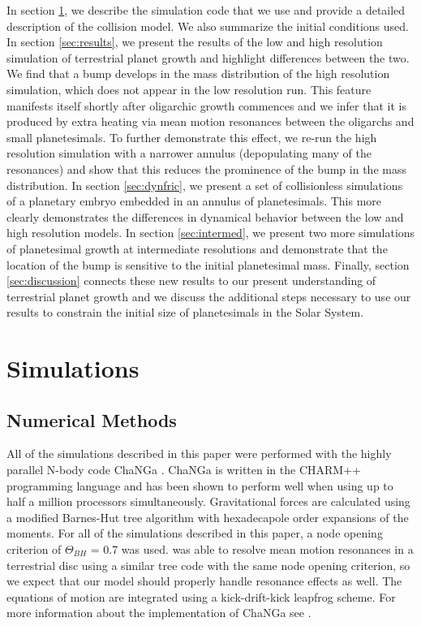 In section \ref{sec:sim}, we describe the simulation code that we use and provide a detailed description of the collision model. 
We also summarize the initial conditions used. In section \ref{sec:results}, we present the results of the low and high resolution 
simulation of terrestrial planet growth and highlight differences between the two. We find that a bump develops in the mass 
distribution of the high resolution simulation, which does not appear in the low resolution run. This feature manifests itself shortly 
after oligarchic growth commences and we infer that it is produced by extra heating via mean motion resonances between the 
oligarchs and small planetesimals. To further demonstrate this effect, we re-run the high resolution simulation with a narrower 
annulus (depopulating many of the resonances) and show that this reduces the prominence of the bump in the mass distribution. 
In section \ref{sec:dynfric}, we present a set of collisionless simulations of a planetary embryo embedded in an annulus of 
planetesimals. This more clearly demonstrates the differences in dynamical behavior between the low and high resolution 
models. In section \ref{sec:intermed}, we present two more simulations of planetesimal growth at intermediate resolutions and 
demonstrate that the location of the bump is sensitive to the initial planetesimal mass. Finally, section \ref{sec:discussion} 
connects these new results to our present understanding of terrestrial planet growth and we discuss the additional steps 
necessary to use our results to constrain the initial size of planetesimals in the Solar System.

\section{Simulations} \label{sec:sim}

\subsection{Numerical Methods} \label{sec:numerical}

All of the simulations described in this paper were performed with the highly parallel N-body code {\sc ChaNGa} . 
{\sc ChaNGa} is written in the {\sc CHARM++} programming language and has been shown to perform well when using up to 
half a million processors \cite{menon15} simultaneously. Gravitational forces are calculated using a modified Barnes-Hut tree 
algorithm with hexadecapole order expansions of the moments. For all of the simulations described in this paper, a node 
opening criterion of $\Theta_{BH}$ = 0.7 was used. \cite{richardson00} was able to resolve mean motion resonances in a 
terrestrial disc using a similar tree code with the same node opening criterion, so we expect that our model should properly 
handle resonance effects as well. The equations of motion are integrated using a kick-drift-kick leapfrog scheme. For more 
information about the implementation of {\sc ChaNGa} see \cite{jetley08}.

